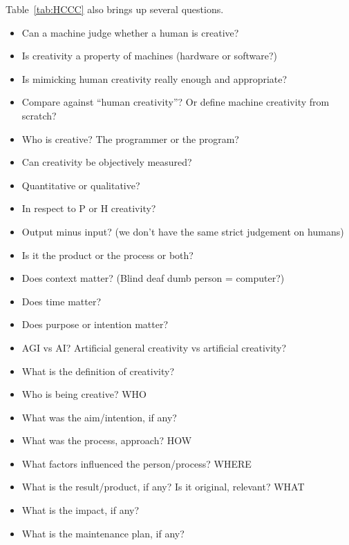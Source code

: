 
\spirals

Table~\ref{tab:HCCC} also brings up several questions.

\begin{itemize}
  \item Can a machine judge whether a human is creative?
  \item Is creativity a property of machines (hardware or software?)
  \item Is mimicking human creativity really enough and appropriate?
  \item Compare against ``human creativity''? Or define machine creativity from scratch?
  \item Who is creative? The programmer or the program?
  \item Can creativity be objectively measured?
  \item Quantitative or qualitative?
  \item In respect to P or H creativity?
  \item Output minus input? (we don’t have the same strict judgement on humans)
  \item Is it the product or the process or both?
  \item Does context matter? (Blind deaf dumb person = computer?)
  \item Does time matter?
  \item Does purpose or intention matter?
  \item AGI vs AI? Artificial general creativity vs artificial creativity?
  \item What is the definition of creativity?
  \item Who is being creative? WHO
  \item What was the aim/intention, if any?
  \item What was the process, approach? HOW
  \item What factors influenced the person/process? WHERE
  \item What is the result/product, if any? Is it original, relevant? WHAT
  \item What is the impact, if any?
  \item What is the maintenance plan, if any?
\end{itemize}


\spirals

